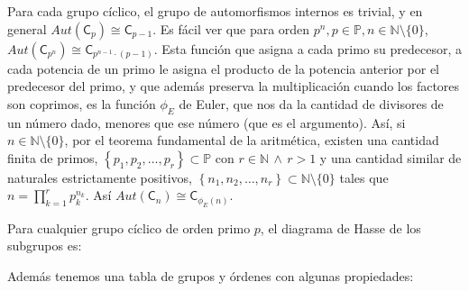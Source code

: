 \documentclass[12pt,a4paper,fleqn,spanish,final,openright]{extbook}
\theoremstyle{definition}
\theoremstyle{remark}
\begin{document}
Para cada grupo cíclico, el grupo de automorfismos internos es trivial,
y en general $Aut(\mathsf{C}_p)      \cong       \mathsf{C}_{p-1}$. Es fácil ver que
para orden $p^n , p      \in \mathds{P} , n      \in \mathds{N}\setminus\{0\}$,
$Aut(\mathsf{C}_{p^n})      \cong       \mathsf{C}_{p^{n-1}       \cdot (p-1)}$.
Esta función que asigna a cada primo su predecesor, a cada potencia de un primo
le asigna el producto de la potencia anterior por el predecesor del primo, y que
además preserva la multiplicación cuando los factores son coprimos, es la función
$\phi_{E}$ de Euler, que nos da la cantidad de divisores de un número dado,
menores que ese número (que es el argumento). Así, si
$n    \in \mathds{N}\setminus\{0\}$, por el teorema fundamental de la aritmética,
existen una cantidad finita de primos,
$\left\lbrace p_1 , p_2 , \ldots , p_r \right\rbrace       \subset \mathds{P}$ con
$r      \in \mathds{N}\,      \wedge      \, r>1$ y una cantidad similar de naturales
estrictamente positivos, $\left\lbrace n_1, n_2 , \ldots , n_r \right\rbrace
   \subset \mathds{N}\setminus\{0\}$ tales que $n = {\prod}_{k=1}^{r} p_k^{n_k}$.
Así $Aut(\mathsf{C}_n)      \cong       \mathsf{C}_{{\phi_E}(n)}$.

Para cualquier grupo cíclico de orden primo $p$, el diagrama de Hasse de
los subgrupos es:

\begin{center}
\end{center}

Además tenemos una tabla de grupos y órdenes con algunas propiedades:
\end{document}

